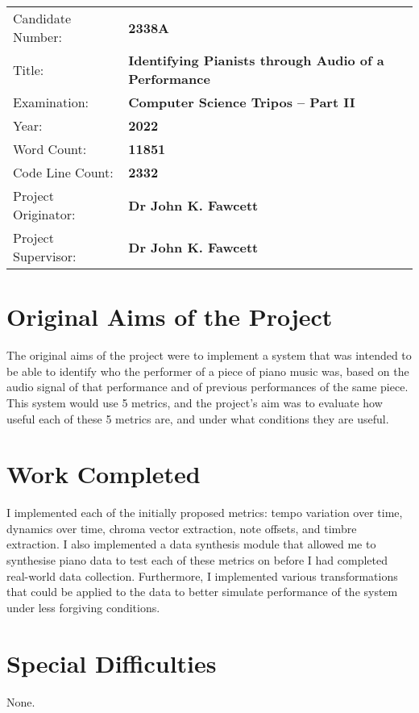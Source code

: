 \documentclass[crop=false]{standalone}
\begin{document}
  \begin{tabular}{ll}
    Candidate Number: &\textbf{2338A} \\
    Title: &\textbf{Identifying Pianists through Audio of a Performance} \\
    Examination: &\textbf{Computer Science Tripos -- Part II} \\
    Year: &\textbf{2022} \\
    Word Count: &\textbf{11851}\footnotemark \\
    Code Line Count: &\textbf{2332}\footnotemark \\
    Project Originator: &\textbf{Dr John K. Fawcett} \\
    Project Supervisor: &\textbf{Dr John K. Fawcett}
  \end{tabular}

  \section*{Original Aims of the Project}

  The original aims of the project were to implement a system that was intended to be able to identify who the performer of a piece of piano music was, based on the audio signal of that performance and of previous performances of the same piece. This system would use 5 metrics, and the project's aim was to evaluate how useful each of these 5 metrics are, and under what conditions they are useful.

  \section*{Work Completed}
  I implemented each of the initially proposed metrics: tempo variation over time, dynamics over time, chroma vector extraction, note offsets, and timbre extraction. I also implemented a data synthesis module that allowed me to synthesise piano data to test each of these metrics on before I had completed real-world data collection. Furthermore, I implemented various transformations that could be applied to the data to better simulate performance of the system under less forgiving conditions.

  \section*{Special Difficulties}
  None.

\end{document}
